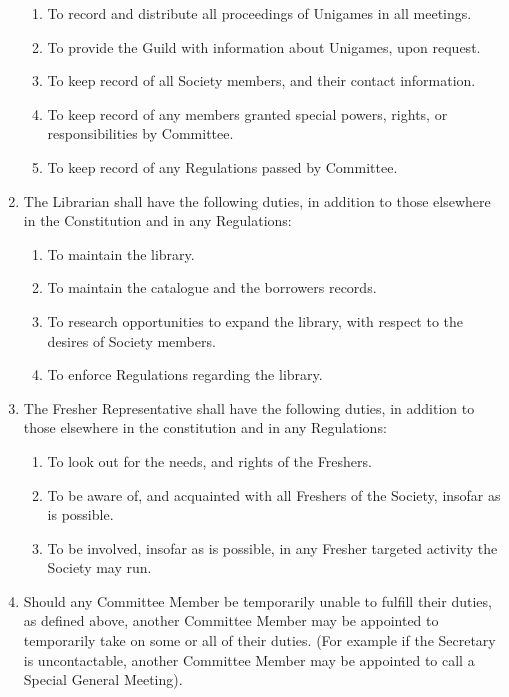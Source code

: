 \documentclass[a4paper]{article}
\begin{document}
\begin{enumerate}
              \begin{enumerate}
                  \item To record and distribute all proceedings of Unigames in all meetings.
                  \item To provide the Guild with information about Unigames, upon request.
                  \item To keep record of all Society members, and their contact information.
                  \item To keep record of any members granted special powers, rights, or responsibilities by Committee.
                  \item To keep record of any Regulations passed by Committee.
              \end{enumerate}
        \item The Librarian shall have the following duties, in addition to those elsewhere in the Constitution and in any Regulations:
              \begin{enumerate}
                  \item To maintain the library.
                  \item To maintain the catalogue and the borrowers records.
                  \item To research opportunities to expand the library, with respect to the desires of Society members.
                  \item To enforce Regulations regarding the library.
              \end{enumerate}
        \item The Fresher Representative shall have the following duties, in addition to those elsewhere in the constitution and in any Regulations:
              \begin{enumerate}
                  \item To look out for the needs, and rights of the Freshers.
                  \item To be aware of, and acquainted with all Freshers of the Society, insofar as is possible.
                  \item To be involved, insofar as is possible, in any Fresher targeted activity the Society may run.
              \end{enumerate}
        \item Should any Committee Member be temporarily unable to fulfill their duties, as defined above, another Committee Member may be appointed to temporarily take on some or all of their duties. (For example if the Secretary is uncontactable, another Committee Member may be appointed to call a Special General Meeting).
    \end{enumerate}
\end{document}

